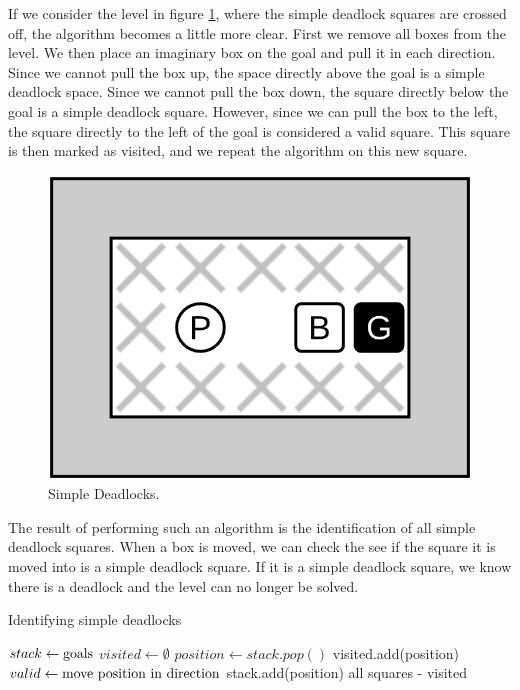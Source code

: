 \documentclass[times, 10pt,twocolumn]{article}
\begin{document}
If we consider the level in figure \ref{fig:sd}, where the simple deadlock squares are crossed off, the algorithm becomes a little more clear. First we remove all boxes from the level. We then place an imaginary box on the goal and pull it in each direction. Since we cannot pull the box up, the space directly above the goal is a simple deadlock space. Since we cannot pull the box down, the square directly below the goal is a simple deadlock square. However, since we can pull the box to the left, the square directly to the left of the goal is considered a valid square. This square is then marked as visited, and we repeat the algorithm on this new square. 

\begin{figure}[h] 
  \centering
     \includegraphics[width=0.5\linewidth]{images/simple_deadlock.png}
  \caption{Simple Deadlocks.}
  \label{fig:sd}
\end{figure}

The result of performing such an algorithm is the identification of all simple deadlock squares. When a box is moved, we can check the see if the square it is moved into is a simple deadlock square. If it is a simple deadlock square, we know there is a deadlock and the level can no longer be solved.

\begin{algorithm}
  \caption{Identifying simple deadlocks}
\begin{algorithmic}[1]
    \State $stack\gets \textnormal{goals}$
    \State $visited\gets \emptyset$
      \State $position\gets stack.pop()$
      \State visited.add(position)
          \State $valid\gets \textnormal{move position in direction}$
          \State stack.add(position)
        \EndIf
      \EndFor
    \EndWhile
    \State \Return all squares - visited
  \EndFunction
  \end{algorithmic}
\end{algorithm}
\end{document}

